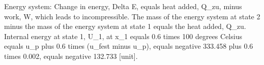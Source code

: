 Energy system:
Change in energy, Delta E, equals heat added, Q_zu, minus work, W, which leads to incompressible.
The mass of the energy system at state 2 minus the mass of the energy system at state 1 equals the heat added, Q_zu.
Internal energy at state 1, U_1, at x_1 equals 0.6 times 100 degrees Celsius equals u_p plus 0.6 times (u_fest minus u_p),
equals negative 333.458 plus 0.6 times 0.002,
equals negative 132.733 [unit].